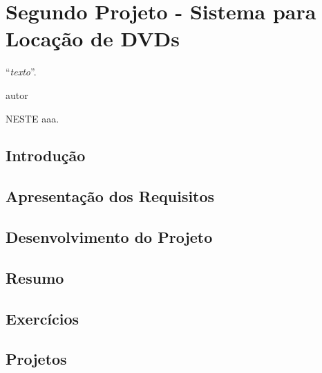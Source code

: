 \chapter{Segundo Projeto - Sistema para Locação de DVDs}
\epigraph{``\textit{texto}''.}{autor}

\lettrine[lines=4, lhang=0.1, lraise=0, loversize=0.2, findent=0.1em]{\textcolor{corAzulTema}{N}}{ESTE} aaa.

\section{Introdução}

\section{Apresentação dos Requisitos}

\section{Desenvolvimento do Projeto}

\section{Resumo}

\section{Exercícios}

\section{Projetos}